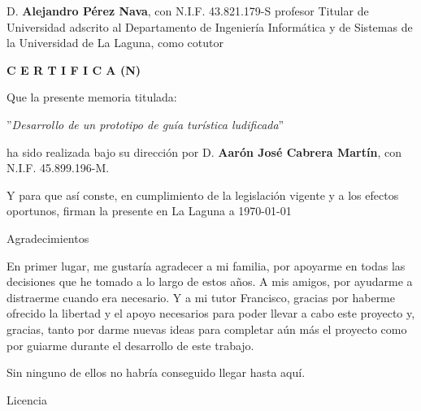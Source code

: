 \documentclass[spanish,a4paper,12pt,oneside]{extreport}
\begin{document}
\bigskip
D. {\bf Alejandro Pérez Nava}, con N.I.F. 43.821.179-S profesor Titular de Universidad adscrito al Departamento de Ingeniería Informática y de Sistemas de la Universidad de La Laguna, como cotutor\pagestyle{empty}

\bigskip
\bigskip
{\bf C E R T I F I C A (N)}

\bigskip
\bigskip
Que la presente memoria titulada:

\bigskip
''{\it Desarrollo de un prototipo de guía turística ludificada}''

\bigskip
\bigskip
\bigskip

\noindent ha sido realizada bajo su dirección por D. {\bf Aarón José Cabrera Martín},
con N.I.F. 45.899.196-M.

\bigskip
\bigskip

Y para que así conste, en cumplimiento de la legislación vigente y a los efectos
oportunos, firman la presente en La Laguna a \today

\newpage
\thispagestyle{empty}

{ \flushright

\begin{LARGE}
Agradecimientos
\end{LARGE}

\hspace{3mm}

\begin{large}
En primer lugar, me gustaría agradecer a mi familia, por apoyarme en todas las decisiones que he tomado a lo largo de estos años. A mis amigos, por ayudarme a distraerme cuando era necesario. Y a mi tutor Francisco, gracias por haberme ofrecido la libertad y el apoyo necesarios para poder llevar a cabo este proyecto y, gracias, tanto por darme nuevas ideas para completar aún más el proyecto como por guiarme durante el desarrollo de este trabajo.

Sin ninguno de ellos no habría conseguido llegar hasta aquí.
\end{large}

}
\newpage
\thispagestyle{empty}

\bigskip
\begin{LARGE}
Licencia
\end{LARGE}

\bigskip
\end{document}
